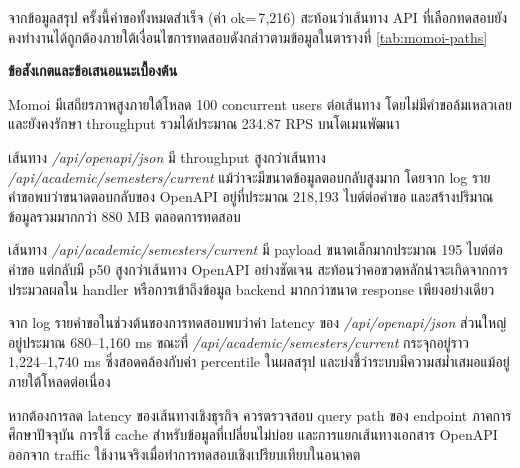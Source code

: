 \hspace*{1.3em}
จากข้อมูลสรุป ครั้งนี้คำขอทั้งหมดสำเร็จ (ค่า ok=\,7{,}216) สะท้อนว่าเส้นทาง API ที่เลือกทดสอบยังคงทำงานได้ถูกต้องภายใต้เงื่อนไขการทดสอบดังกล่าวตามข้อมูลในตารางที่ \ref{tab:momoi-paths}

\begin{table}[htbp]
    \centering
    \caption{}
    \fontSixTeen
    \label{tab:momoi-paths}
\end{table}

\hspace*{1.3em}
\textbf{ข้อสังเกตและข้อเสนอแนะเบื้องต้น}
\begin{mycustomitem}
    \item Momoi มีเสถียรภาพสูงภายใต้โหลด 100 concurrent users ต่อเส้นทาง โดยไม่มีคำขอล้มเหลวเลย และยังคงรักษา throughput รวมได้ประมาณ 234.87 RPS บนโดเมนพัฒนา
    \item เส้นทาง \textit{/api/openapi/json} มี throughput สูงกว่าเส้นทาง \textit{/api/academic/semesters/current} แม้ว่าจะมีขนาดข้อมูลตอบกลับสูงมาก โดยจาก log รายคำขอพบว่าขนาดตอบกลับของ OpenAPI อยู่ที่ประมาณ 218{,}193 ไบต์ต่อคำขอ และสร้างปริมาณข้อมูลรวมมากกว่า 880 MB ตลอดการทดสอบ
    \item เส้นทาง \textit{/api/academic/semesters/current} มี payload ขนาดเล็กมากประมาณ 195 ไบต์ต่อคำขอ แต่กลับมี p50 สูงกว่าเส้นทาง OpenAPI อย่างชัดเจน สะท้อนว่าคอขวดหลักน่าจะเกิดจากการประมวลผลใน handler หรือการเข้าถึงข้อมูล backend มากกว่าขนาด response เพียงอย่างเดียว
    \item จาก log รายคำขอในช่วงต้นของการทดสอบพบว่าค่า latency ของ \textit{/api/openapi/json} ส่วนใหญ่อยู่ประมาณ 680--1{,}160 ms ขณะที่ \textit{/api/academic/semesters/current} กระจุกอยู่ราว 1{,}224--1{,}740 ms ซึ่งสอดคล้องกับค่า percentile ในผลสรุป และบ่งชี้ว่าระบบมีความสม่ำเสมอแม้อยู่ภายใต้โหลดต่อเนื่อง
    \item หากต้องการลด latency ของเส้นทางเชิงธุรกิจ ควรตรวจสอบ query path ของ endpoint ภาคการศึกษาปัจจุบัน การใช้ cache สำหรับข้อมูลที่เปลี่ยนไม่บ่อย และการแยกเส้นทางเอกสาร OpenAPI ออกจาก traffic ใช้งานจริงเมื่อทำการทดสอบเชิงเปรียบเทียบในอนาคต
\end{mycustomitem}

